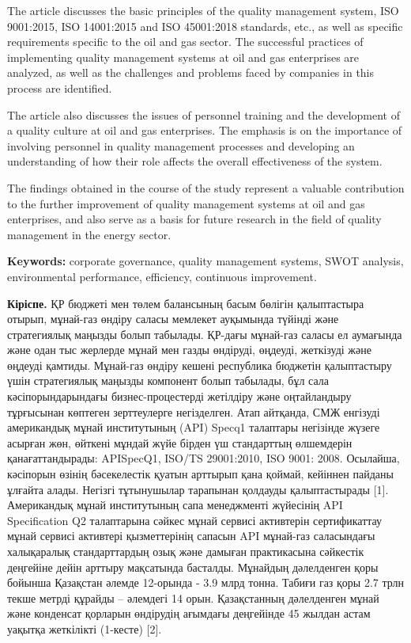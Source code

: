 The article discusses the basic principles of the quality management
system, ISO 9001:2015, ISO 14001:2015 and ISO 45001:2018 standards,
etc., as well as specific requirements specific to the oil and gas
sector. The successful practices of implementing quality management
systems at oil and gas enterprises are analyzed, as well as the
challenges and problems faced by companies in this process are
identified.

The article also discusses the issues of personnel training and the
development of a quality culture at oil and gas enterprises. The
emphasis is on the importance of involving personnel in quality
management processes and developing an understanding of how their role
affects the overall effectiveness of the system.

The findings obtained in the course of the study represent a valuable
contribution to the further improvement of quality management systems at
oil and gas enterprises, and also serve as a basis for future research
in the field of quality management in the energy sector.

{\bfseries Keywords:} corporate governance, quality management systems,
SWOT analysis, environmental performance, efficiency, continuous
improvement.

\begin{multicols}{2}
{\bfseries Кіріспе.} ҚР бюджеті мен төлем балансының басым бөлігін
қалыптастыра отырып, мұнай-газ өндіру саласы мемлекет ауқымында түйінді
және стратегиялық маңызды болып табылады. ҚР-дағы мұнай-газ саласы ел
аумағында және одан тыс жерлерде мұнай мен газды өндіруді, өңдеуді,
жеткізуді және өңдеуді қамтиды. Мұнай-газ өндіру кешені республика
бюджетін қалыптастыру үшін стратегиялық маңызды компонент болып
табылады, бұл сала кәсіпорындарындағы бизнес-процестерді жетілдіру және
оңтайландыру тұрғысынан көптеген зерттеулерге негізделген. Атап
айтқанда, СМЖ енгізуді американдық мұнай институтының (API) Specq1
талаптары негізінде жүзеге асырған жөн, өйткені мұндай жүйе бірден үш
стандарттың өлшемдерін қанағаттандырады: APISpecQ1, ISO/TS 29001:2010,
ISO 9001: 2008. Осылайша, кәсіпорын өзінің бәсекелестік қуатын арттырып
қана қоймай, кейіннен пайданы ұлғайта алады. Негізгі тұтынушылар
тарапынан қолдауды қалыптастырады {[}1{]}. Американдық мұнай
институтының сапа менеджменті жүйесінің API Specification Q2 талаптарына
сәйкес мұнай сервисі активтерін сертификаттау мұнай сервисі активтері
қызметтерінің сапасын API мұнай-газ саласындағы халықаралық
стандарттардың озық және дамыған практикасына сәйкестік деңгейіне дейін
арттыру мақсатында басталды. Мұнайдың дәлелденген қоры бойынша Қазақстан
әлемде 12-орында - 3.9 млрд тонна. Табиғи газ қоры 2.7 трлн текше метрді
құрайды -- әлемдегі 14 орын. Қазақстанның дәлелденген мұнай және
конденсат қорларын өндірудің ағымдағы деңгейінде 45 жылдан астам уақытқа
жеткілікті (1-кесте) {[}2{]}.
\end{multicols}

